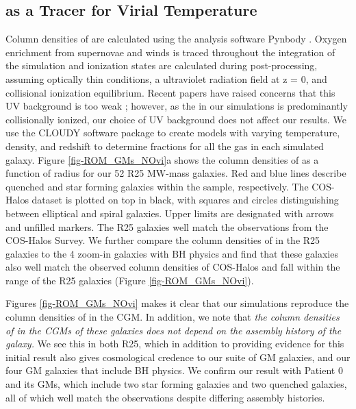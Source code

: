 \documentclass[]{emulateapj}
\begin{document}
\subsection{ as a Tracer for Virial Temperature}
\label{Result:OviasTtracer}
Column densities of  are calculated using the analysis software Pynbody \citep{pynbody}. Oxygen enrichment from supernovae and winds is traced throughout the integration of the simulation and ionization states are calculated during post-processing, assuming optically thin conditions, a \cite{Haardt2012} ultraviolet radiation field at z = 0, and collisional ionization equilibrium. Recent papers have raised concerns that this UV background is too weak \citep{Kollmeier2014,Shull2015}; however, as the  in our simulations is predominantly collisionally ionized, our choice of UV background does not affect our results. We use the CLOUDY software package \citep{Stinson2012,Ferland2013} to create models with varying temperature, density, and redshift to determine  fractions for all the gas in each simulated galaxy. Figure \ref{fig-ROM_GMs_NOvi}a shows the column densities of  as a function of radius for our 52 R25 MW-mass galaxies. Red and blue lines describe quenched and star forming galaxies within the sample, respectively. The COS-Halos dataset is plotted on top in black, with squares and circles distinguishing between elliptical and spiral galaxies. Upper limits are designated with arrows and unfilled markers. The R25 galaxies well match the observations from the COS-Halos Survey. We further compare the column densities of  in the R25 galaxies to the 4 zoom-in galaxies with BH physics and find that these galaxies also well match the observed column densities of COS-Halos and fall within the range of the R25 galaxies (Figure \ref{fig-ROM_GMs_NOvi}). 

Figures \ref{fig-ROM_GMs_NOvi} makes it clear that our simulations reproduce the column densities of  in the CGM. In addition, we note that \textit{the column densities of  in the CGMs of these galaxies does not depend on the assembly history of the galaxy.} We see this in both R25, which in addition to providing evidence for this initial result also gives cosmological credence to our suite of GM galaxies, and our four GM galaxies that include BH physics. We confirm our result with Patient 0 and its GMs, which include two star forming galaxies and two quenched galaxies, all of which well match the  observations despite differing assembly histories.
\end{document}
